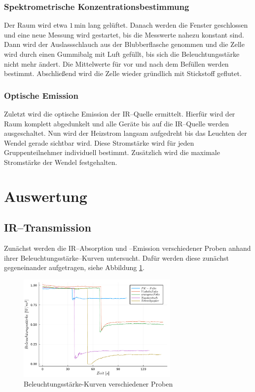 \documentclass[12pt,a4paper]{scrartcl}
\numberwithin{equation}{section} %
\begin{document}
\subsubsection{Spektrometrische Konzentrationsbestimmung}
\label{howto:Spektrometrische Konzentrationsbestimmung}
Der Raum wird etwa $1\mathrm{\,min}$ lang gelüftet. Danach werden die Fenster geschlossen und eine neue Messung wird gestartet, bis die Messwerte nahezu konstant sind. Dann wird der Auslassschlauch aus der Blubberflasche genommen und die Zelle wird durch einen Gummibalg mit Luft gefüllt, bis sich die Beleuchtungsstärke nicht mehr ändert. Die Mittelwerte für vor und nach dem Befüllen werden bestimmt. Abschließend wird die Zelle wieder gründlich mit Stickstoff geflutet.

\subsubsection{Optische Emission}
\label{howto:Optische Emission}
Zuletzt wird die optische Emission der IR--Quelle ermittelt. Hierfür wird der Raum komplett abgedunkelt und alle Geräte bis auf die IR--Quelle werden ausgeschaltet. Nun wird der Heizstrom langsam aufgedreht bis das Leuchten der Wendel gerade sichtbar wird. Diese Stromstärke wird für jeden Gruppenteilnehmer individuell bestimmt. Zusätzlich wird die maximale Stromstärke der Wendel festgehalten.

\clearpage
\hypertarget{auswertung}{%
\section{Auswertung}\label{auswertung}}
\subsection{IR--Transmission}
\label{IR--Transmission}

Zunächst werden die IR--Absorption und --Emission verschiedener Proben anhand ihrer Beleuchtungsstärke--Kurven untersucht. Dafür werden diese zunächst gegeneinander aufgetragen, siehe Abbildung \ref{fig:materialien}.

\begin{figure}[h]
	\centering
	\includegraphics[width=0.7\textwidth]{../media/B1.1/materialien.pdf}
	\caption{Beleuchtungsstärke-Kurven verschiedener Proben}
	\label{fig:materialien}
\end{figure}
\end{document}
